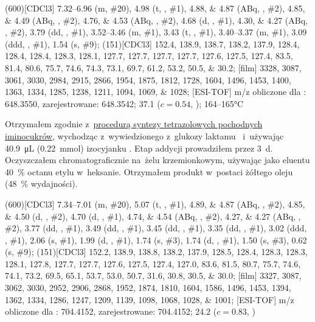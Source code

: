 \begin{fullexp}
	\NMR(600)[CDCl3] \numrange{7.32}{6.96} (m, \#{20}), \num{4.98} (t, , \#{1}), \numlist{4.88;4.87} (ABq, , \#{2}), \numlist{4.85;4.49} (ABq, , \#{2}), \numlist{4.76;4.53} (ABq, , \#{2}), \num{4.68} (d, , \#{1}), \numlist{4.30;4.27} (ABq, , \#{2}), \num{3.79} (dd, , \#{1}), \numrange{3.52}{3.46} (m, \#{1}), \num{3.43} (t, , \#{1}), \numrange{3.40}{3.37} (m, \#{1}), \num{3.09} (ddd, , \#{1}), \num{1.54} (s, \#{9});
	(151)[CDCl3] \numlist{152.4; 138.9; 138.7; 138.2; 137.9; 128.4; 128.4; 128.4; 128.3; 128.1; 127.7; 127.7; 127.7; 127.7; 127.6; 127.5; 127.4; 83.5; 81.4; 80.6; 75.7; 74.6; 74.3; 73.1; 69.7; 61.2; 53.2; 50.5; 30.2};
	[film] \numlist{3328; 3087; 3061; 3030; 2984; 2915; 2866; 1954; 1875; 1812; 1728; 1604; 1496; 1453; 1400; 1363; 1334; 1285; 1238; 1211; 1094; 1069; 1028};
	[ESI-TOF] m/z obliczone dla : \num{648.3550}, zarejestrowane: \num{648.3542};
	\data{[$\alpha^{23}_D$]~$=$} \num{37.1} ($c = 0.54$, );
	 \numrange{164}{165}\si{\celsius}
\end{fullexp}

Otrzymałem zgodnie z~\hyperref[experimental:sugars:schwartz]{procedurą syntezy tetrazolowych
	pochodnych iminocukrów}, wychodząc z~wywiedzionego z~glukozy laktamu~
	i~używając \SI{40.9}{\micro\liter} (\SI{0.22}{\milli\mol}) izocyjanku .
Etap addycji prowadziłem przez \SI{3}{\day}.
Oczyszczałem chromatograficznie na~żelu krzemionkowym,
	używając jako eluentu \SI{40}{\percent} octanu etylu w~heksanie.
Otrzymałem produkt w~postaci żółtego oleju (\SI{48}{\percent} wydajności).

\begin{fullexp}
	\NMR(600)[CDCl3] \numrange{7.34}{7.01} (m, \#{20}), \num{5.07} (t, , \#{1}), \numlist{4.89;4.87} (ABq, , \#{2}), \numlist{4.85;4.50} (d, , \#{2}), \num{4.70} (d, , \#{1}), \numlist{4.74;4.54} (ABq, , \#{2}), \numlist{4.27;4.27} (ABq, , \#{2}), \num{3.77} (dd, , \#{1}), \num{3.49} (dd, , \#{1}), \num{3.45} (dd, , \#{1}), \num{3.35} (dd, , \#{1}), \num{3.02} (ddd, , \#{1}), \num{2.06} (s, \#{1}), \num{1.99} (d, , \#{1}), \num{1.74} (s, \#{3}), \num{1.74} (d, , \#{1}), \num{1.50} (s, \#{3}), \num{0.62} (s, \#{9});
	(151)[CDCl3] \numlist{152.2; 138.9; 138.8; 138.2; 137.9; 128.5; 128.4; 128.3; 128.3; 128.1; 127.8; 127.7; 127.7; 127.6; 127.5; 127.4; 127.0; 83.6; 81.5; 80.7; 75.7; 74.6; 74.1; 73.2; 69.5; 65.1; 53.7; 53.0; 50.7; 31.6; 30.8; 30.5; 30.0};
	[film] \numlist{3327; 3087; 3062; 3030; 2952; 2906; 2868; 1952; 1874; 1810; 1604; 1586; 1496; 1453; 1394; 1362; 1334; 1286; 1247; 1209; 1139; 1098; 1068; 1028; 1001};
	[ESI-TOF] m/z obliczone dla : \num{704.4152}, zarejestrowane: \num{704.4152};
	\data{[$\alpha^{23}_D$]~$=$} \num{24.2} ($c = 0.83$, )
\end{fullexp}

